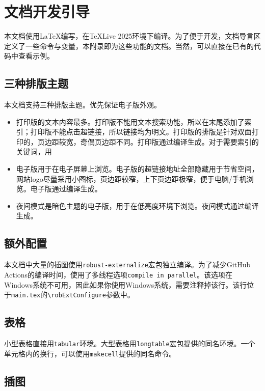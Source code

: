 \chapter{文档开发引导}

本文档使用\LaTeX 编写，在TeXLive 2025环境下编译。为了便于开发，文档导言区定义了一些命令与变量，本附录即为这些功能的文档。当然，可以直接在已有的代码中查看示例。

\section{三种排版主题}

本文档支持三种排版主题。优先保证电子版外观。

\begin{itemize}
  \item 打印版的文本内容最多。打印版不能用文本搜索功能，所以在末尾添加了索引；打印版不能点击超链接，所以链接均为明文。打印版的排版是针对双面打印的，页边距较宽，奇偶页边距不同。打印版通过编译生成。对于需要索引的关键词，用
  \item 电子版用于在电子屏幕上浏览。电子版的超链接地址全部隐藏用于节省空间，网站logo尽量采用小图标，页边距较窄，上下页边距极窄，便于电脑/手机浏览。电子版通过编译生成。
  \item 夜间模式是暗色主题的电子版，用于在低亮度环境下浏览。夜间模式通过编译生成。
\end{itemize}

\section{额外配置}
本文档中大量的插图使用\lstinline{robust-externalize}宏包独立编译。为了减少GitHub Actions的编译时间，使用了多线程选项\lstinline{compile in parallel}。该选项在Windows系统不可用，因此如果你使用Windows系统，需要注释掉该行。该行位于\lstinline{main.tex}的\lstinline|\robExtConfigure|参数中。

\section{表格}
小型表格直接用\lstinline{tabular}环境。大型表格用\lstinline{longtable}宏包提供的同名环境。一个单元格内的换行，可以使用\lstinline{makecell}提供的同名命令。

\section{插图}

